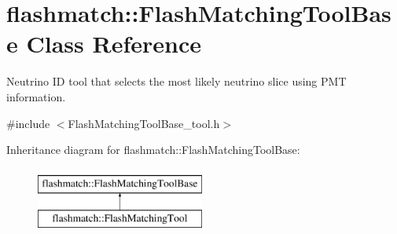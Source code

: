 \hypertarget{classflashmatch_1_1FlashMatchingToolBase}{}\section{flashmatch\+:\+:Flash\+Matching\+Tool\+Base Class Reference}
\label{classflashmatch_1_1FlashMatchingToolBase}


Neutrino ID tool that selects the most likely neutrino slice using P\+MT information.  




{\ttfamily \#include $<$Flash\+Matching\+Tool\+Base\+\_\+tool.\+h$>$}

Inheritance diagram for flashmatch\+:\+:Flash\+Matching\+Tool\+Base\+:\begin{figure}[H]
\begin{center}
\leavevmode
\includegraphics[height=2.000000cm]{classflashmatch_1_1FlashMatchingToolBase}
\end{center}
\end{figure}
